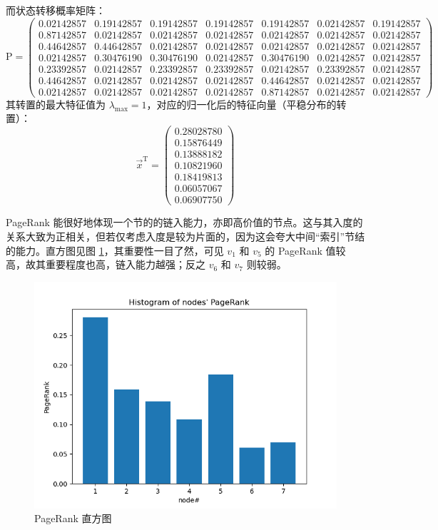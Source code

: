 \documentclass{article}
\begin{document}
而状态转移概率矩阵：
$$
{\mathrm{P}}=
\begin{pmatrix}
    0.02142857&0.19142857&0.19142857&0.19142857&0.19142857&0.02142857&0.19142857\\
    0.87142857&0.02142857&0.02142857&0.02142857&0.02142857&0.02142857&0.02142857\\
    0.44642857&0.44642857&0.02142857&0.02142857&0.02142857&0.02142857&0.02142857\\
    0.02142857&0.30476190&0.30476190&0.02142857&0.30476190&0.02142857&0.02142857\\
    0.23392857&0.02142857&0.23392857&0.23392857&0.02142857&0.23392857&0.02142857\\
    0.44642857&0.02142857&0.02142857&0.02142857&0.44642857&0.02142857&0.02142857\\
    0.02142857&0.02142857&0.02142857&0.02142857&0.87142857&0.02142857&0.02142857
\end{pmatrix}
$$
其转置的最大特征值为 $\lambda_{\mathrm{max}}=1$，对应的归一化后的特征向量（平稳分布的转置）：
$$
\vec{x}^{\mathrm{T}}=
\begin{pmatrix}
    0.28028780\\
    0.15876449\\
    0.13888182\\
    0.10821960\\
    0.18419813\\
    0.06057067\\
    0.06907750
\end{pmatrix}
$$

PageRank 能很好地体现一个节的的链入能力，亦即高价值的节点。这与其入度的关系大致为正相关，但若仅考虑入度是较为片面的，因为这会夸大中间“索引”节结的能力。直方图见图 \ref{fig:3}，其重要性一目了然，可见 $v_1$ 和 $v_5$ 的 PageRank 值较高，故其重要程度也高，链入能力越强；反之 $v_6$ 和 $v_7$ 则较弱。
\begin{figure}[ht]
    \label{fig:3}
    \centering
    \includegraphics[width=.5\textwidth]{fig3.png}
    \caption{PageRank 直方图}
\end{figure}
\end{document}
